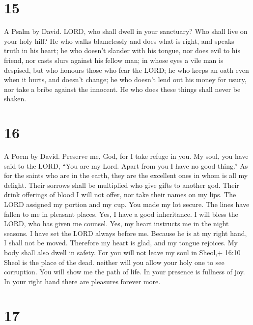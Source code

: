\hypertarget{section-14}{%
\section{15}\label{section-14}}

A Psalm by David.  LORD, who shall dwell in your sanctuary?
Who shall live on your holy hill?  He who walks blamelessly
and does what is right, and speaks truth in his heart;  he
who doesn't slander with his tongue, nor does evil to his friend, nor
casts slurs against his fellow man;  in whose eyes a vile
man is despised, but who honours those who fear the LORD; he who keeps
an oath even when it hurts, and doesn't change;  he who
doesn't lend out his money for usury, nor take a bribe against the
innocent. He who does these things shall never be shaken.

\hypertarget{section-15}{%
\section{16}\label{section-15}}

A Poem by David.  Preserve me, God, for I take refuge in
you.  My soul, you have said to the LORD, ``You are my Lord.
Apart from you I have no good thing.''  As for the saints
who are in the earth, they are the excellent ones in whom is all my
delight.  Their sorrows shall be multiplied who give gifts
to another god. Their drink offerings of blood I will not offer, nor
take their names on my lips.  The LORD assigned my portion
and my cup. You made my lot secure.  The lines have fallen
to me in pleasant places. Yes, I have a good inheritance.  I
will bless the LORD, who has given me counsel. Yes, my heart instructs
me in the night seasons.  I have set the LORD always before
me. Because he is at my right hand, I shall not be moved. 
Therefore my heart is glad, and my tongue rejoices. My body shall also
dwell in safety.  For you will not leave my soul in Sheol,+
16:10 Sheol is the place of the dead. neither will you allow your holy
one to see corruption.  You will show me the path of life.
In your presence is fullness of joy. In your right hand there are
pleasures forever more.

\hypertarget{section-16}{%
\section{17}\label{section-16}}

